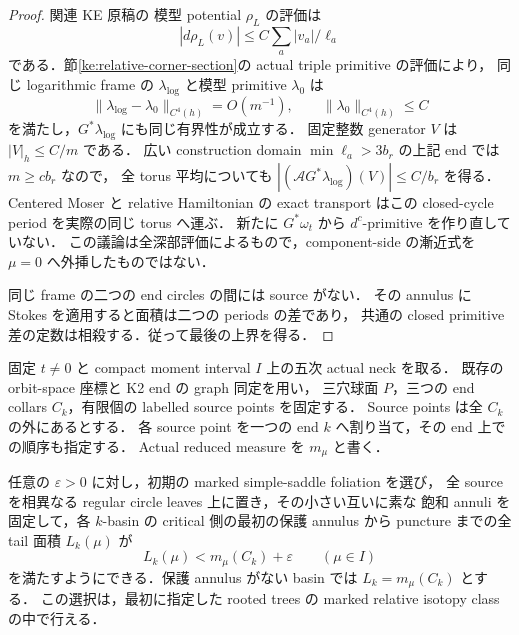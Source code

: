 \begin{proof}
関連 KE 原稿\cite[\texttt{coarse:eq:simplex-log-gradient}]{KELocalCurrent}の
模型 potential $\rho_L$ の評価は
\[
 |d\rho_L(v)|\le C\sum_a |v_a|/\ell_a
\]
である．節\ref{ke:relative-corner-section}の actual triple primitive の評価により，
同じ logarithmic frame の $\lambda_{\log}$ と模型 primitive $\lambda_0$ は
\[
 \|\lambda_{\log}-\lambda_0\|_{C^4(h)}=O(m^{-1}),
 \qquad \|\lambda_0\|_{C^4(h)}\le C
\]
を満たし，$G^*\lambda_{\log}$ にも同じ有界性が成立する．
固定整数 generator $V$ は $|V|_h\le C/m$ である．
広い construction domain $\min\ell_a>3b_r$ の上記 end では $m\ge c b_r$ なので，
全 torus 平均についても
$|(\mathcal A G^*\lambda_{\log})(V)|\le C/b_r$ を得る．
Centered Moser と relative Hamiltonian の exact transport はこの closed-cycle
period を実際の同じ torus へ運ぶ．
新たに $G^*\omega_t$ から $d^c$-primitive を作り直していない．
この議論は全深部評価によるもので，component-side の漸近式を
$\mu=0$ へ外挿したものではない．

同じ frame の二つの end circles の間には source がない．
その annulus に Stokes を適用すると面積は二つの periods の差であり，
共通の closed primitive 差の定数は相殺する．従って最後の上界を得る．
\end{proof}

\begin{lemma}
\label{ng8:thin-source-tail-choice}
固定 $t\ne0$ と compact moment interval $I$ 上の五次 actual neck を取る．
既存の orbit-space 座標と K2 end の graph 同定を用い，
三穴球面 $P$，三つの end collars $C_k$，有限個の labelled source points を固定する．
Source points は全 $C_k$ の外にあるとする．
各 source point を一つの end $k$ へ割り当て，その end 上での順序も指定する．
Actual reduced measure を $m_\mu$ と書く．

任意の $\varepsilon>0$ に対し，初期の marked simple-saddle foliation を選び，
全 source を相異なる regular circle leaves 上に置き，その小さい互いに素な
飽和 annuli を固定して，各 $k$-basin の critical 側の最初の保護 annulus から
puncture までの全 tail 面積 $L_k(\mu)$ が
\[
 L_k(\mu)<m_\mu(C_k)+\varepsilon\qquad(\mu\in I)
\]
を満たすようにできる．保護 annulus がない basin では $L_k=m_\mu(C_k)$ とする．
この選択は，最初に指定した rooted trees の marked relative isotopy class の中で行える．
\end{lemma}

